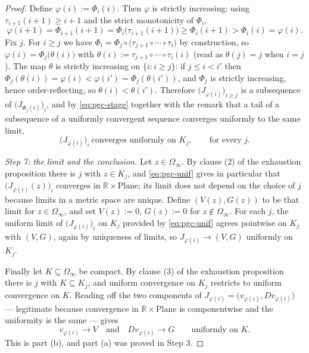 \begin{proof}
Define $\varphi(i):=\Phi_i(i)$.  Then $\varphi$ is strictly increasing: using
$\tau_{i+1}(i+1)\ge i+1$ and the strict monotonicity of $\Phi_i$,
\[
  \varphi(i+1)=\Phi_{i+1}(i+1)=\Phi_i\bigl(\tau_{i+1}(i+1)\bigr)\ge\Phi_i(i+1)>\Phi_i(i)=\varphi(i).
\]
Fix $j$.  For $i\ge j$ we have $\Phi_i=\Phi_j\circ\bigl(\tau_{j+1}\circ\cdots\circ\tau_i\bigr)$
by construction, so $\varphi(i)=\Phi_j\bigl(\theta(i)\bigr)$ with
$\theta(i):=\tau_{j+1}\circ\cdots\circ\tau_i(i)$ (read as $\theta(j)=j$ when $i=j$).  The map
$\theta$ is strictly increasing on $\{i:i\ge j\}$: if $j\le i<i'$ then
$\Phi_j(\theta(i))=\varphi(i)<\varphi(i')=\Phi_j(\theta(i'))$, and $\Phi_j$ is strictly
increasing, hence order-reflecting, so $\theta(i)<\theta(i')$.  Therefore
$\bigl(J_{\varphi(i)}\bigr)_{i\ge j}$ is a subsequence of $\bigl(J_{\Phi_j(i)}\bigr)_i$, and by
\eqref{eq:pgc-stage} together with the remark that a tail of a subsequence of a uniformly
convergent sequence converges uniformly to the same limit,
\begin{equation}\label{eq:pgc-unif}
  \bigl(J_{\varphi(i)}\bigr)_i\ \text{converges uniformly on }K_j,\qquad\text{for every }j .
\end{equation}

\medskip\noindent\emph{Step 7: the limit and the conclusion.}
Let $z\in\Omega_\infty$.  By clause (2) of the exhaustion proposition there is $j$ with
$z\in K_j$, and \eqref{eq:pgc-unif} gives in particular that $\bigl(J_{\varphi(i)}(z)\bigr)_i$
converges in $\mathbb{R}\times\mathrm{Plane}$; its limit does not depend on the choice of $j$
because limits in a metric space are unique.  Define $(V(z),G(z))$ to be that limit for
$z\in\Omega_\infty$, and set $V(z):=0$, $G(z):=0$ for $z\notin\Omega_\infty$.  For each $j$, the
uniform limit of $\bigl(J_{\varphi(i)}\bigr)_i$ on $K_j$ provided by \eqref{eq:pgc-unif} agrees
pointwise on $K_j$ with $(V,G)$, again by uniqueness of limits, so
$J_{\varphi(i)}\to(V,G)$ uniformly on $K_j$.

Finally let $K\subseteq\Omega_\infty$ be compact.  By clause (3) of the exhaustion proposition
there is $j$ with $K\subseteq K_j$, and uniform convergence on $K_j$ restricts to uniform
convergence on $K$.  Reading off the two components of
$J_{\varphi(i)}=\bigl(v_{\varphi(i)},Dv_{\varphi(i)}\bigr)$ --- legitimate because convergence
in $\mathbb{R}\times\mathrm{Plane}$ is componentwise and the uniformity is the same --- gives
\[
  v_{\varphi(i)}\to V\quad\text{and}\quad Dv_{\varphi(i)}\to G\qquad\text{uniformly on }K .
\]
This is part (b), and part (a) was proved in Step 3.
\end{proof}
